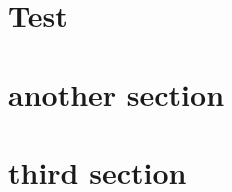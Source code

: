 \documentclass{article}
\begin{document}
\tableofcontents

\section{Test}
\lipsum[2]
\lipsum[2]
\lipsum[2]
\lipsum[2]
\lipsum[2]
\section{another section}
\lipsum[2]
\lipsum[2]
\lipsum[2]
\section{third section}
\lipsum[2]
\lipsum[2]
\end{document}
